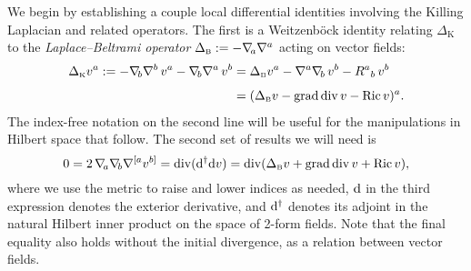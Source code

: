 \documentclass[12pt,letterpaper]{iopart}
\newcommand\Lap[1][K]{\Delta_{\scriptscriptstyle\mathrm{#1}}}
\newcommand\defn[1]{{\slshape #1\/}}
\DeclareMathOperator\Ric{Ric}
\begin{document}
We begin by establishing a couple local differential identities involving the Killing Laplacian and related operators.  The first is a Weitzenb\"ock identity relating $\Lap$ to the \defn{Laplace--Beltrami operator} $\Lap[B] := - \grad\!_a \grad^a$ acting on vector fields: 
%
\begin{align}\label{KLWeitz}
	\Lap v^a 
		:= - \grad\!_b \grad^b\, v^a - \grad\!_b \grad^a\, v^b
		&= \Lap[B] v^a - \grad^a \grad\!_b\, v^b - R^a{}_b\, v^b
			\notag\\[1ex]
		&= (\Lap[B] v - \Grad \Div v - \Ric v)^a.
\end{align}
%
The index-free notation on the second line will be useful for the manipulations in Hilbert space that follow.  The second set of results we will need is 
%
\begin{equation}\label{ddcvf}
	0 	= 2\, \grad\!_a \grad\!_b \grad^{[a} v^{b]} 
		= \Div (\ed^\dagger \ed v)
		= \Div (\Lap[B] v + \Grad \Div v + \Ric v), 
\end{equation}
%
where we use the metric to raise and lower indices as needed, $\mathrm{d}$ in the third expression denotes the exterior derivative, and $\mathrm{d}^\dagger$ denotes its adjoint in the natural Hilbert inner product on the space of 2-form fields.  Note that the final equality also holds without the initial divergence, as a relation between vector fields.
\end{document}
